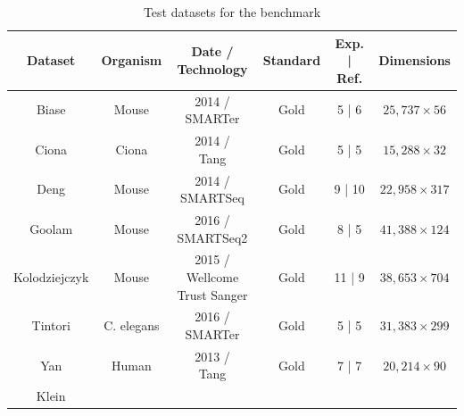 \documentclass{report}
\begin{document}
{\begin{table}[H]
\centering
\caption{Test datasets for the benchmark}
\begin{tabular}{| c | c | c | c | c | c |}
\hline
\parbox[c]{3cm}{\textbf{Dataset}} & 
\parbox[c]{2cm}{\textbf{Organism}} & 
\parbox[c]{3cm}{\textbf{Date /\\Technology}} & 
\parbox[c]{2cm}{\textbf{Standard}} &
\parbox[c]{2cm}{\textbf{Exp. | Ref.}}&
\parbox[c]{2cm}{\textbf{Dimensions}}\\
\hline
\parbox[c]{3cm}{Biase\cite{biase2014cell}} & 
\parbox[c]{2cm}{Mouse} & 
\parbox[c]{3cm}{2014 /\\SMARTer} & 
\parbox[c]{2cm}{Gold} &
\parbox[c]{2cm}{5 | 6}&
\parbox[c]{2cm}{$25,737 \times 56$}\\
\hline
\parbox[c]{3cm}{Ciona\cite{suyama2016singlecell}}& 
\parbox[c]{2cm}{Ciona}& 
\parbox[c]{3cm}{2014 /\\Tang} & 
\parbox[c]{2cm}{Gold}&
\parbox[c]{2cm}{5 | 5}&
\parbox[c]{2cm}{$15,288 \times 32$}\\
\hline
\parbox[c]{3cm}{Deng\cite{deng2014single}}& 
\parbox[c]{2cm}{Mouse}& 
\parbox[c]{2cm}{2014 /\\SMARTSeq} & 
\parbox[c]{2cm}{Gold}&
\parbox[c]{2cm}{9 | 10}&
\parbox[c]{2cm}{$22,958 \times 317$}\\
\hline
\parbox[c]{3cm}{Goolam\cite{goolam2016heterogeneity}} & 
\parbox[c]{2cm}{Mouse} & 
\parbox[c]{3cm}{2016 /\\SMARTSeq2} & 
\parbox[c]{2cm}{Gold} &
\parbox[c]{2cm}{8 | 5}&
\parbox[c]{2cm}{$41,388 \times 124$}\\
\hline
\parbox[c]{3cm}{Kolodziejczyk\cite{kolodziejczyk2015single}} & 
\parbox[c]{2cm}{Mouse} & 
\parbox[c]{3cm}{2015 /\\Wellcome Trust Sanger} & 
\parbox[c]{2cm}{Gold}&
\parbox[c]{2cm}{11 | 9}&
\parbox[c]{2cm}{$38,653 \times 704$}\\
\hline
\parbox[c]{3cm}{Tintori\cite{tintori2016transcriptional}}& 
\parbox[c]{2cm}{C. elegans}& 
\parbox[c]{3cm}{2016 /\\SMARTer} & 
\parbox[c]{2cm}{Gold}&
\parbox[c]{2cm}{5 | 5}&
\parbox[c]{2cm}{$31,383 \times 299$}\\
\hline
\parbox[c]{3cm}{Yan\cite{yan2013single}}& 
\parbox[c]{2cm}{Human} & 
\parbox[c]{3cm}{2013 /\\Tang} & 
\parbox[c]{2cm}{Gold} &
\parbox[c]{2cm}{7 | 7}&
\parbox[c]{2cm}{$20,214 \times 90$}\\
\hline
\parbox[c]{3cm}{Klein\cite{klein2015droplet}} & 

\end{tabular}
\end{table}}
\end{document}

